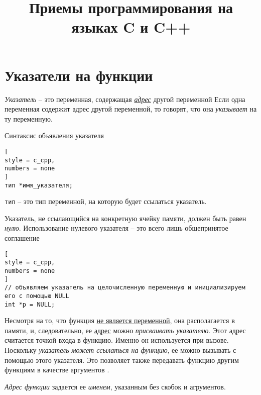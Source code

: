 \documentclass[%
	11pt,
	a4paper,
	utf8,
		]{article}
\begin{document}
\title{Приемы программирования на языках C и C++}

\author{}

\date{}
\maketitle

\thispagestyle{fancy}

\tableofcontents

\section{Указатели на функции}

\emph{Указатель} -- это переменная, содержащая \underline{\itshape адрес} другой переменной  Если одна переменная содержит {адрес} другой переменной, то говорят, что она \emph{указывает} на ту переменную\cite[]{koltzov-c-lang:2019}.

Синтаксис объявления указателя
\begin{lstlisting}[
style = c_cpp,
numbers = none
]
тип *имя_указателя;
\end{lstlisting}

\texttt{тип} -- это тип переменной, на которую будет ссылаться указатель.

Указатель, не ссылающийся на конкретную ячейку памяти, должен быть равен \emph{нулю}. Использование нулевого указателя -- это всего лишь общепринятое соглашение
\begin{lstlisting}[
style = c_cpp,
numbers = none
]
// объявляем указатель на целочисленную переменную и инициализируем его с помощью NULL
int *p = NULL; 
\end{lstlisting}


Несмотря на то, что функция \underline{не является переменной}, она располагается в памяти, и, следовательно, ее \underline{адрес} можно \emph{присваивать указателю}. Этот адрес считается точкой входа в функцию. Именно он используется при вызове. Поскольку \emph{указатель может ссылаться на функцию}, ее можно вызывать с помощью этого указателя. Это позволяет также передавать функцию другим функциям в качестве аргументов \cite{koltzov-c-lang:2019}.

\emph{Адрес функции} задается ее \emph{именем}, указанным без скобок и агрументов.
\end{document}
